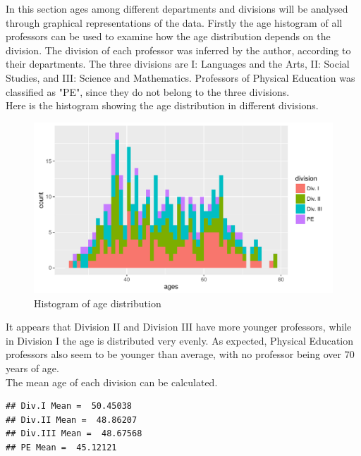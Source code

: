 \documentclass{article}\usepackage[]{graphicx}\usepackage[]{color}
\makeatletter
\def\maxwidth{ %
  \ifdim\Gin@nat@width>\linewidth
    \linewidth
  \else
    \Gin@nat@width
  \fi
}
\newenvironment{kframe}{%
 \def\at@end@of@kframe{}%
 \ifinner\ifhmode%
  \def\at@end@of@kframe{\end{minipage}}%
  \begin{minipage}{\columnwidth}%
 \fi\fi%
 \def\FrameCommand##1{\hskip\@totalleftmargin \hskip-\fboxsep
 \colorbox{shadecolor}{##1}\hskip-\fboxsep
     \hskip-\linewidth \hskip-\@totalleftmargin \hskip\columnwidth}%
 \MakeFramed {\advance\hsize-\width
   \@totalleftmargin\z@ \linewidth\hsize
   \@setminipage}}%
 {\par\unskip\endMakeFramed%
 \at@end@of@kframe}
\newenvironment{knitrout}{}{} %
\makeatother
\begin{document}
In this section ages among different departments and divisions will be analysed through graphical
representations of the data. Firstly the age histogram of all professors can be used to examine how the
age distribution depends on the division. The division of each professor was inferred by the author,
according to their departments. The three divisions are I: Languages and the Arts, II: Social Studies, and
III: Science and Mathematics. Professors of Physical Education was classified as "PE", since they do not
belong to the three divisions.\\

Here is the histogram showing the age distribution in different divisions.

\begin{knitrout}
\color{fgcolor}\begin{figure}[h]
\includegraphics[width=\maxwidth]{figure/unnamed-chunk-4-1} \caption[Histogram of age distribution]{Histogram of age distribution}\label{fig:unnamed-chunk-4}
\end{figure}


\end{knitrout}

It appears that Division II and Division III have more younger professors, while in Division I the age is
distributed very evenly. As expected, Physical Education professors also seem to be younger than average, with
no professor being over 70 years of age. \\

The mean age of each division can be calculated.

\begin{knitrout}
\color{fgcolor}\begin{kframe}
\begin{verbatim}
## Div.I Mean =  50.45038 
## Div.II Mean =  48.86207 
## Div.III Mean =  48.67568 
## PE Mean =  45.12121
\end{verbatim}
\end{kframe}
\end{knitrout}
\end{document}
